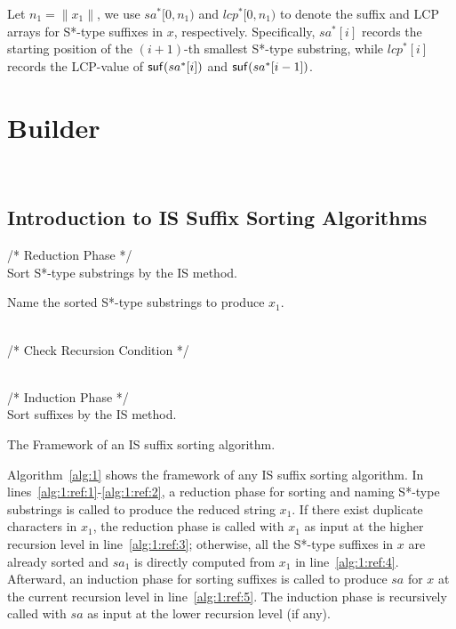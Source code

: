 \documentclass[10pt,journal,compsoc]{IEEEtran}
\begin{document}
Let $n_1 = \|x_1\|$, we use $sa^*[0, n_1)$ and $lcp^*[0, n_1)$ to denote the suffix and LCP arrays for S*-type suffixes in $x$, respectively. Specifically, $sa^*[i]$ records the starting position of the $(i + 1)$-th smallest S*-type substring, while $lcp^*[i]$ records the LCP-value of ${\sf suf}(sa^*[i])$ and ${\sf suf}(sa^*[i - 1])$.


\section{Builder}~\label{sec:builder}

\subsection{Introduction to IS Suffix Sorting Algorithms} \label{subsec:improvement}

\begin{algorithm}
	\SetAlgoNoLine
	
	/* Reduction Phase */ \\
	Sort S*-type substrings by the IS method. \label{alg:1:ref:1}
	
	Name the sorted S*-type substrings to produce $x_1$. \label{alg:1:ref:2}
	
	~\\
	
	/* Check Recursion Condition */ \\	
	
	~\\
	
	/* Induction Phase */ \\
	Sort suffixes by the IS method.  \label{alg:1:ref:5}
	
	
	\caption{The Framework of an IS suffix sorting algorithm.}
	
	\label{alg:1}
\end{algorithm}

Algorithm~\ref{alg:1} shows the framework of any IS suffix sorting algorithm. In lines~\ref{alg:1:ref:1}-\ref{alg:1:ref:2}, a reduction phase for sorting and naming S*-type substrings is called to produce the reduced string $x_1$. If there exist duplicate characters in $x_1$, the reduction phase is called with $x_1$ as input at the higher recursion level in line~\ref{alg:1:ref:3}; otherwise, all the S*-type suffixes in $x$ are already sorted and $sa_1$ is directly computed from $x_1$ in line~\ref{alg:1:ref:4}. Afterward, an induction phase for sorting suffixes is called to produce $sa$ for $x$ at the current recursion level in line~\ref{alg:1:ref:5}. The induction phase is recursively called with $sa$ as input at the lower recursion level (if any). 
\end{document}
